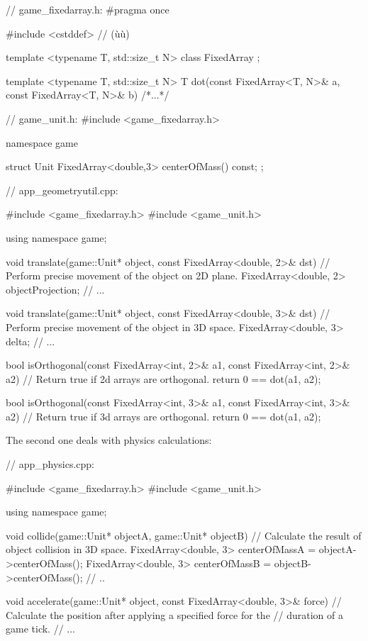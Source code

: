 \begin{emcppshiddenlisting}[emcppsbatch=e5]
// game_fixedarray.h:
#pragma once

#include <cstddef>  // (ù{}ù)

template <typename T, std::size_t N>
class FixedArray {};

template <typename T, std::size_t N>
T dot(const FixedArray<T, N>& a, const FixedArray<T, N>& b) { /*...*/ }

// game_unit.h:
#include <game_fixedarray.h>

namespace game {

struct Unit {
      FixedArray<double,3> centerOfMass() const;      
};

}
\end{emcppshiddenlisting}
\begin{emcppslisting}[emcppsbatch=e5]
// app_geometryutil.cpp:

#include <game_fixedarray.h>
#include <game_unit.h>

using namespace game;

void translate(game::Unit* object, const FixedArray<double, 2>& dst)
    // Perform precise movement of the object on 2D plane.
{
    FixedArray<double, 2> objectProjection;
    // ...
}

void translate(game::Unit* object, const FixedArray<double, 3>& dst)
    // Perform precise movement of the object in 3D space.
{
    FixedArray<double, 3> delta;
    // ...
}

bool isOrthogonal(const FixedArray<int, 2>& a1, const FixedArray<int, 2>& a2)
    // Return true if 2d arrays are orthogonal.
{
    return 0 == dot(a1, a2);
}

bool isOrthogonal(const FixedArray<int, 3>& a1, const FixedArray<int, 3>& a2)
    // Return true if 3d arrays are orthogonal.
{
    return 0 == dot(a1, a2);
}
\end{emcppslisting}

\noindent The second one deals with physics calculations:

\begin{emcppslisting}[emcppsbatch=e5]
// app_physics.cpp:

#include <game_fixedarray.h>
#include <game_unit.h>

using namespace game;

void collide(game::Unit* objectA, game::Unit* objectB)
    // Calculate the result of object collision in 3D space.
{
    FixedArray<double, 3> centerOfMassA = objectA->centerOfMass();
    FixedArray<double, 3> centerOfMassB = objectB->centerOfMass();
    // ..
}

void accelerate(game::Unit* object, const FixedArray<double, 3>& force)
    // Calculate the position after applying a specified force for the
    // duration of a game tick.
{
    // ...
}
\end{emcppslisting}

